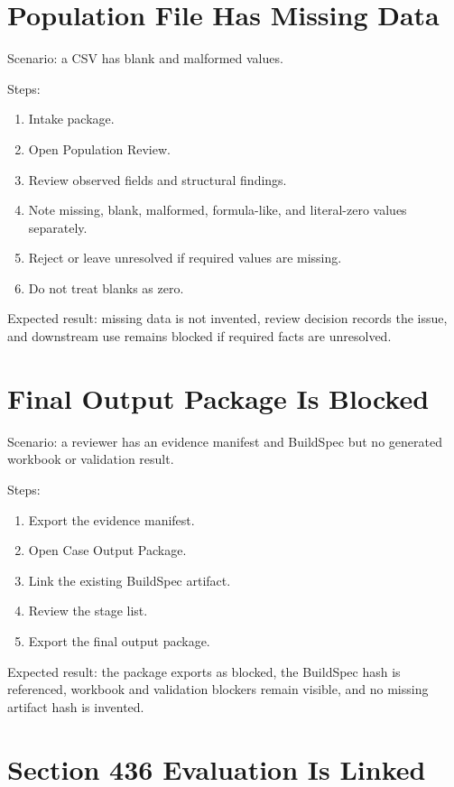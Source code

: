 \section{Population File Has Missing Data}

Scenario: a CSV has blank and malformed values.

Steps:

\begin{enumerate}
  \item Intake package.
  \item Open Population Review.
  \item Review observed fields and structural findings.
  \item Note missing, blank, malformed, formula-like, and literal-zero values separately.
  \item Reject or leave unresolved if required values are missing.
  \item Do not treat blanks as zero.
\end{enumerate}

Expected result: missing data is not invented, review decision records the issue, and downstream use remains blocked if required facts are unresolved.

\section{Final Output Package Is Blocked}

Scenario: a reviewer has an evidence manifest and BuildSpec but no generated workbook or validation result.

Steps:

\begin{enumerate}
  \item Export the evidence manifest.
  \item Open Case Output Package.
  \item Link the existing BuildSpec artifact.
  \item Review the stage list.
  \item Export the final output package.
\end{enumerate}

Expected result: the package exports as blocked, the BuildSpec hash is referenced, workbook and validation blockers remain visible, and no missing artifact hash is invented.

\section{Section 436 Evaluation Is Linked}

